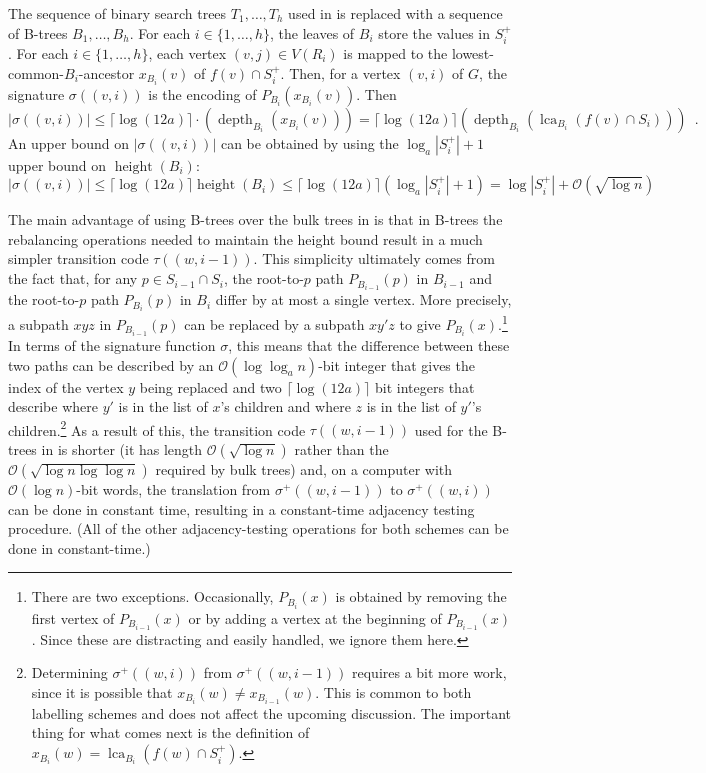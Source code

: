 \documentclass{patmorin}
\renewcommand{\le}{\leqslant}
\DeclareMathOperator{\height}{height}
\DeclareMathOperator{\depth}{depth}
\DeclareMathOperator{\lca}{lca}
\newcommand{\Oh}{\mathcal{O}}
\begin{document}
  The sequence of binary search trees $T_1,\ldots,T_h$ used in \cite{gawrychowski.janczewski:simpler} is replaced with a sequence of B-trees $B_1,\ldots,B_h$.
  For each $i\in\{1,\ldots,h\}$, the leaves of $B_i$ store the values in $S^+_i$.
  For each $i\in\{1,\ldots,h\}$, each vertex $(v,j)\in V(R_i)$ is mapped to the lowest-common-$B_i$-ancestor $x_{B_i}(v)$ of $f(v)\cap S^+_i$.
  Then, for a vertex $(v,i)$ of $G$, the signature $\sigma((v,i))$ is the encoding of $P_{B_i}(x_{B_i}(v))$.
  Then
  \[
    |\sigma((v,i))| \le \lceil\log (12a)\rceil\cdot(\depth_{B_i}(x_{B_i}(v))) = \lceil\log (12a)\rceil(\depth_{B_i}(\lca_{B_i}(f(v)\cap S_i))) \enspace .
  \]
  An upper bound on $|\sigma((v,i))|$ can be obtained by using the $\log_a |S^+_i|+1$ upper bound on $\height(B_i)$:
  \[
    |\sigma((v,i))|\le \lceil\log (12a)\rceil\height(B_i) \le \lceil\log (12a)\rceil(\log_a |S^+_i| + 1)= \log |S^+_i| + \Oh(\sqrt{\log n})
  \]

  The main advantage of using B-trees over the bulk trees in \cite{dujmovic.esperet.ea:adjacency} is that in B-trees the rebalancing operations needed to maintain the height bound result in a much simpler transition code $\tau((w,i-1))$.
  This simplicity ultimately comes from the fact that, for any $p\in S_{i-1}\cap S_i$, the root-to-$p$ path $P_{B_{i-1}}(p)$ in $B_{i-1}$ and the root-to-$p$ path $P_{B_i}(p)$ in $B_i$ differ by at most a single vertex.
  More precisely, a subpath $xyz$ in $P_{B_{i-1}}(p)$ can be replaced by a subpath $xy'z$ to give $P_{B_i}(x)$.\footnote{There are two exceptions.
  Occasionally, $P_{B_i}(x)$ is obtained by removing the first vertex of $P_{B_{i-1}}(x)$ or by adding a vertex at the beginning of $P_{B_{i-1}}(x)$.
  Since these are distracting and easily handled, we ignore them here.}  In terms of the signature function $\sigma$, this means that the difference between these two paths can be described by an $\Oh(\log\log_a n)$-bit integer that gives the index of the vertex $y$ being replaced and two $\lceil\log (12a)\rceil$ bit integers that describe where $y'$ is in the list of $x$'s children and where $z$ is in the list of $y'$'s children.\footnote{Determining $\sigma^+((w,i))$ from $\sigma^+((w,i-1))$ requires a bit more work, since it is possible that $x_{B_i}(w)\neq x_{B_{i-1}}(w)$.
  This is common to both labelling schemes and does not affect the upcoming discussion.
  The important thing for what comes next is the definition of $x_{B_i}(w)=\lca_{B_i}(f(w)\cap S^+_i)$.}  As a result of this, the transition code $\tau((w,i-1))$ used for the B-trees in \cite{gawrychowski.janczewski:simpler} is shorter (it has length $\Oh(\sqrt{\log n})$ rather than the $\Oh(\sqrt{\log n\log\log n})$ required by bulk trees) and, on a computer with $\Oh(\log n)$-bit words, the translation from $\sigma^+((w,i-1))$ to $\sigma^+((w,i))$ can be done in constant time, resulting in a constant-time adjacency testing procedure.
  (All of the other adjacency-testing operations for both schemes can be done in constant-time.)
\end{document}
